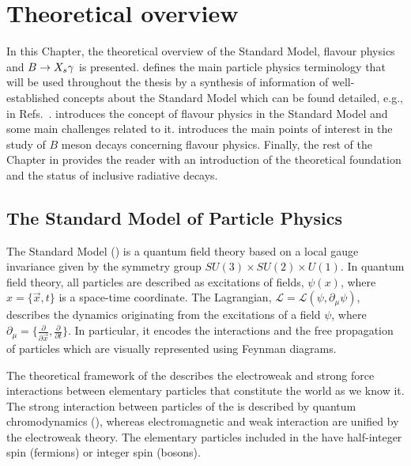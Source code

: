 \chapter{Theoretical overview}\label{ch:theory}

In this Chapter, the theoretical overview of the Standard Model, 
flavour physics and $\makebox{\BtoXsgamma}$ is presented.
 defines the main particle physics terminology that will be used throughout the thesis by a synthesis of 
information of well-established concepts about the Standard Model which can be found detailed, e.g., in Refs.~\cite{Peskin:1995ev,Thomson:2013zua,Griffiths:2008zz}.
 introduces the concept of flavour physics in the Standard Model and some main challenges related to it.
 introduces the main points of interest in the study of $B$ meson decays concerning flavour physics.
Finally, the rest of the Chapter in  provides the reader with an introduction of the theoretical foundation and the status of inclusive radiative decays.


\section{The Standard Model of Particle Physics} \label{sec:standard_model}

The Standard Model (\SM) is a quantum field theory based on a local gauge invariance given by the symmetry group $SU(3)\times SU(2)\times U(1)$.
In quantum field theory, all particles are described as excitations of fields, $\psi(x)$, 
where $x=\{\vec{x},t\}$ is a space-time coordinate.
The Lagrangian, $\mathcal{L}=\mathcal{L}(\psi,\partial_{\mu}\psi)$, describes the dynamics originating from the excitations of a field $\psi$,
where $\partial_{\mu}=\{\frac{\partial}{\partial \vec{x}},\frac{\partial}{\partial t}\}$.
In particular, it encodes the interactions and the free propagation of particles which are visually represented using Feynman diagrams.


The theoretical framework of the \SM describes the electroweak and strong force interactions between elementary particles that constitute the world as we know it.
The strong interaction between particles of the \SM is described by quantum chromodynamics (\QCD), 
whereas electromagnetic and weak interaction are unified by the electroweak theory.
The elementary particles included in the \SM have half-integer spin (fermions) or integer spin (bosons).

